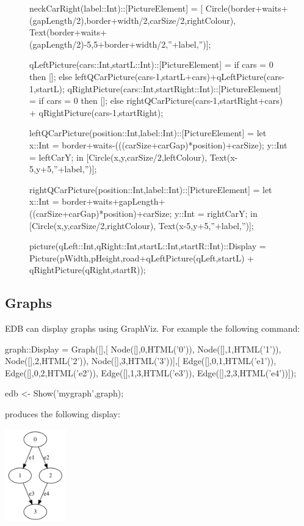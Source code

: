 \documentclass[5p,times]{elsarticle}
\begin{document}
\begin{figure}
\begin{FigESL}
neckCarRight(label::Int)::[PictureElement] = [
  Circle(border+waits+(gapLength/2),border+width/2,carSize/2,rightColour),
  Text(border+waits+(gapLength/2)-5,5+border+width/2,''+label,'')];

qLeftPicture(cars::Int,startL::Int)::[PictureElement]      = if cars = 0 then []; else leftQCarPicture(cars-1,startL+cars)+qLeftPicture(cars-1,startL); 
qRightPicture(cars::Int,startRight::Int)::[PictureElement] =  if cars = 0 then []; else rightQCarPicture(cars-1,startRight+cars) + qRightPicture(cars-1,startRight);
  
leftQCarPicture(position::Int,label::Int)::[PictureElement] = 
  let x::Int = border+waits-(((carSize+carGap)*position)+carSize); 
      y::Int = leftCarY;
  in [Circle(x,y,carSize/2,leftColour), Text(x-5,y+5,''+label,'')];  
     
rightQCarPicture(position::Int,label::Int)::[PictureElement] =
  let x::Int = border+waits+gapLength+((carSize+carGap)*position)+carSize; 
      y::Int = rightCarY;
  in [Circle(x,y,carSize/2,rightColour), Text(x-5,y+5,''+label,'')];

picture(qLeft::Int,qRight::Int,startL::Int,startR::Int)::Display = Picture(pWidth,pHeight,road+qLeftPicture(qLeft,startL) + qRightPicture(qRight,startR));
\end{FigESL}
\end{figure}

\subsection{Graphs}

\label{sec:graphs}

EDB can display graphs using GraphViz. For example the following command:
\begin{ESL}
graph::Display = Graph([],[
  Node([],0,HTML('0')),
  Node([],1,HTML('1')),
  Node([],2,HTML('2')),
  Node([],3,HTML('3'))],[
  Edge([],0,1,HTML('e1')),
  Edge([],0,2,HTML('e2')),
  Edge([],1,3,HTML('e3')),
  Edge([],2,3,HTML('e4'))]);
  
edb <- Show('mygraph',graph);
\end{ESL}
produces the following display:
\begin{center}
\includegraphics[height=4cm]{example_graph}
\end{center}
\end{document}
